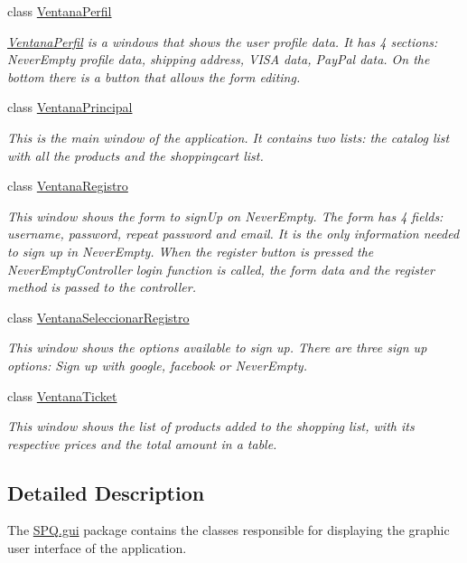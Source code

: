 \begin{DoxyCompactItemize}
class \mbox{\hyperlink{class_s_p_q_1_1gui_1_1_ventana_perfil}{Ventana\+Perfil}}
\begin{DoxyCompactList}\small\item\em \mbox{\hyperlink{class_s_p_q_1_1gui_1_1_ventana_perfil}{Ventana\+Perfil}} is a windows that shows the user profile data. It has 4 sections\+: Never\+Empty profile data, shipping address, V\+I\+SA data, Pay\+Pal data. On the bottom there is a button that allows the form editing. \end{DoxyCompactList}\item 
class \mbox{\hyperlink{class_s_p_q_1_1gui_1_1_ventana_principal}{Ventana\+Principal}}
\begin{DoxyCompactList}\small\item\em This is the main window of the application. It contains two lists\+: the catalog list with all the products and the shoppingcart list. \end{DoxyCompactList}\item 
class \mbox{\hyperlink{class_s_p_q_1_1gui_1_1_ventana_registro}{Ventana\+Registro}}
\begin{DoxyCompactList}\small\item\em This window shows the form to sign\+Up on Never\+Empty. The form has 4 fields\+: username, password, repeat password and email. It is the only information needed to sign up in Never\+Empty. When the register button is pressed the Never\+Empty\+Controller login function is called, the form data and the register method is passed to the controller. \end{DoxyCompactList}\item 
class \mbox{\hyperlink{class_s_p_q_1_1gui_1_1_ventana_seleccionar_registro}{Ventana\+Seleccionar\+Registro}}
\begin{DoxyCompactList}\small\item\em This window shows the options available to sign up. There are three sign up options\+: Sign up with google, facebook or Never\+Empty. \end{DoxyCompactList}\item 
class \mbox{\hyperlink{class_s_p_q_1_1gui_1_1_ventana_ticket}{Ventana\+Ticket}}
\begin{DoxyCompactList}\small\item\em This window shows the list of products added to the shopping list, with its respective prices and the total amount in a table. \end{DoxyCompactList}\end{DoxyCompactItemize}


\subsection{Detailed Description}
The \mbox{\hyperlink{namespace_s_p_q_1_1gui}{S\+P\+Q.\+gui}} package contains the classes responsible for displaying the graphic user interface of the application. 